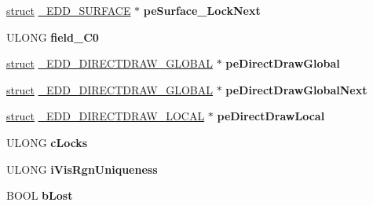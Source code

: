\begin{DoxyCompactItemize}
\item 
\mbox{\label{struct___e_d_d___s_u_r_f_a_c_e_a619f3182f4bbbd313ec27afd62ab0d40}} 
\hyperlink{interfacestruct}{struct} \hyperlink{struct___e_d_d___s_u_r_f_a_c_e}{\+\_\+\+E\+D\+D\+\_\+\+S\+U\+R\+F\+A\+CE} $\ast$ {\bfseries pe\+Surface\+\_\+\+Lock\+Next}
\item 
\mbox{\label{struct___e_d_d___s_u_r_f_a_c_e_a4837dfba8464e7aca409940d2327b1f4}} 
U\+L\+O\+NG {\bfseries field\+\_\+\+C0}
\item 
\mbox{\label{struct___e_d_d___s_u_r_f_a_c_e_a3450d03beb89e11d4e705311e66702cb}} 
\hyperlink{interfacestruct}{struct} \hyperlink{struct___e_d_d___d_i_r_e_c_t_d_r_a_w___g_l_o_b_a_l}{\+\_\+\+E\+D\+D\+\_\+\+D\+I\+R\+E\+C\+T\+D\+R\+A\+W\+\_\+\+G\+L\+O\+B\+AL} $\ast$ {\bfseries pe\+Direct\+Draw\+Global}
\item 
\mbox{\label{struct___e_d_d___s_u_r_f_a_c_e_af1894973d59c9bf4da98fa2d91906c0a}} 
\hyperlink{interfacestruct}{struct} \hyperlink{struct___e_d_d___d_i_r_e_c_t_d_r_a_w___g_l_o_b_a_l}{\+\_\+\+E\+D\+D\+\_\+\+D\+I\+R\+E\+C\+T\+D\+R\+A\+W\+\_\+\+G\+L\+O\+B\+AL} $\ast$ {\bfseries pe\+Direct\+Draw\+Global\+Next}
\item 
\mbox{\label{struct___e_d_d___s_u_r_f_a_c_e_a878cc87875fc86f333b46eaad2cb0b01}} 
\hyperlink{interfacestruct}{struct} \hyperlink{struct___e_d_d___d_i_r_e_c_t_d_r_a_w___l_o_c_a_l}{\+\_\+\+E\+D\+D\+\_\+\+D\+I\+R\+E\+C\+T\+D\+R\+A\+W\+\_\+\+L\+O\+C\+AL} $\ast$ {\bfseries pe\+Direct\+Draw\+Local}
\item 
\mbox{\label{struct___e_d_d___s_u_r_f_a_c_e_aa9847abed8225d3616955cc92ecd2fa1}} 
U\+L\+O\+NG {\bfseries c\+Locks}
\item 
\mbox{\label{struct___e_d_d___s_u_r_f_a_c_e_aabe29fd98e7b1f908eecffc31a9da5cb}} 
U\+L\+O\+NG {\bfseries i\+Vis\+Rgn\+Uniqueness}
\item 
\mbox{\label{struct___e_d_d___s_u_r_f_a_c_e_a69c91dba3cd6db43d6bbcaca5dc137c7}} 
B\+O\+OL {\bfseries b\+Lost}

\end{DoxyCompactItemize}
